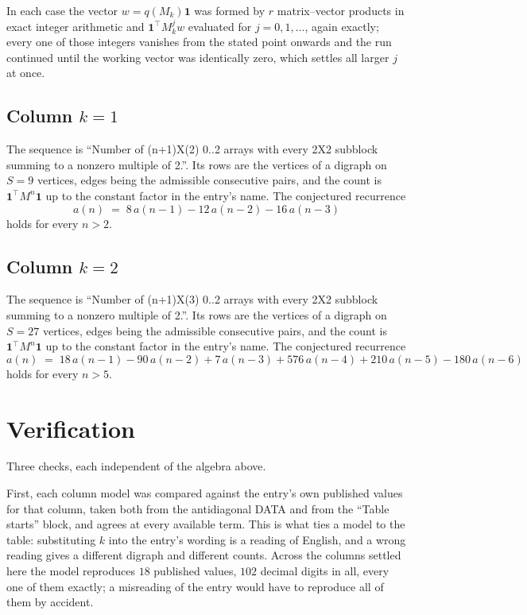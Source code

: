 \documentclass[11pt,a4paper]{article}
\theoremstyle{plain}
\theoremstyle{definition}
\begin{document}
In each case the vector $w=q(M_k)\mathbf{1}$ was formed by $r$ matrix--vector products in
exact integer arithmetic and $\mathbf{1}^{\!\top}M_k^{j}w$ evaluated for $j=0,1,\dots$,
again exactly; every one of those integers vanishes from the stated point onwards and the run
continued until the working vector was identically zero, which settles all larger $j$ at once.

\subsection*{Column $k=1$}
The sequence is ``Number of (n+1)X(2) 0..2 arrays with every 2X2 subblock summing to a nonzero multiple of 2.''. Its rows are the vertices of a digraph on
$S=9$ vertices, edges being the admissible consecutive pairs, and the count is
$\mathbf{1}^{\!\top}M^{n}\mathbf{1}$ up to the constant factor in the entry's name.
The conjectured recurrence
\[
a(n)\;=\;8\,a(n-1) - 12\,a(n-2) - 16\,a(n-3)
\]
holds for every $n>2$.

\subsection*{Column $k=2$}
The sequence is ``Number of (n+1)X(3) 0..2 arrays with every 2X2 subblock summing to a nonzero multiple of 2.''. Its rows are the vertices of a digraph on
$S=27$ vertices, edges being the admissible consecutive pairs, and the count is
$\mathbf{1}^{\!\top}M^{n}\mathbf{1}$ up to the constant factor in the entry's name.
The conjectured recurrence
\[
a(n)\;=\;18\,a(n-1) - 90\,a(n-2) + 7\,a(n-3) + 576\,a(n-4) + 210\,a(n-5) - 180\,a(n-6)
\]
holds for every $n>5$.

\section{Verification}

Three checks, each independent of the algebra above.

First, each column model was compared against the entry's own published values for that
column, taken both from the antidiagonal DATA and from the ``Table starts'' block, and agrees
at every available term. This is what ties a model to the table: substituting $k$ into the
entry's wording is a reading of English, and a wrong reading gives a different digraph and
different counts. Across the columns settled here the model reproduces $18$ published
values, $102$ decimal digits in all, every one of them exactly; a misreading of the entry
would have to reproduce all of them by accident.
\end{document}
